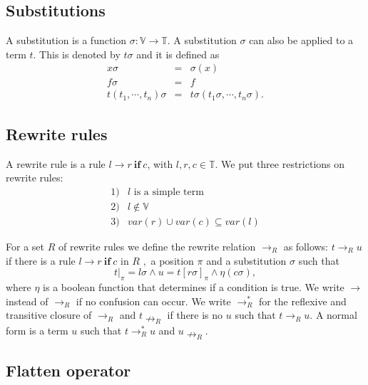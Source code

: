 \documentclass{article}
\begin{document}
\subsection{Substitutions}

A substitution is a function $\sigma :\mathbb{V\rightarrow T}$. A
substitution $\sigma $ can also be applied to a term $t$. This is denoted by 
$t\sigma $ and it is defined as%
\begin{equation*}
\begin{array}{lll}
x\sigma & = & \sigma (x) \\ 
f\sigma & = & f \\ 
t(t_{1},\cdots ,t_{n})\sigma & = & t\sigma (t_{1}\sigma ,\cdots ,t_{n}\sigma
).%
\end{array}%
\end{equation*}

\subsection{Rewrite rules}

A rewrite rule is a rule $l\rightarrow r\ \mathbf{if}\ c$, with $l,r,c\in 
\mathbb{T}$. We put three restrictions on rewrite rules:%
\begin{equation*}
\begin{array}{ll}
1) & l\text{ is a simple term} \\ 
2) & l\notin \mathbb{V} \\ 
3) & var(r)\cup var(c)\subseteq var(l)%
\end{array}%
\end{equation*}

For a set $R$ of rewrite rules we define the rewrite relation $\rightarrow
_{R}$ as follows: $t\rightarrow _{R}u$ if there is a rule $l\rightarrow r\ 
\mathbf{if}\ c$ in $R$ $,$ a position $\pi $ and a substitution $\sigma $
such that%
\begin{equation}
t|_{\pi }=l\sigma \wedge u=t[r\sigma ]_{\pi }\wedge \eta (c\sigma ),
\label{eq:rewriting}
\end{equation}%
where $\eta $ is a boolean function that determines if a condition is true.
We write $\rightarrow $ instead of $\rightarrow _{R}$ if no confusion can
occur. We write $\rightarrow _{R}^{\ast }$ for the reflexive and transitive
closure of $\rightarrow _{R}$ and $t\nrightarrow _{R}$ if there is no $u$
such that $t\rightarrow _{R}u$. A normal form is a term $u$ such that $%
t\rightarrow _{R}^{\ast }u$ and $u\nrightarrow _{R}$.

\subsection{Flatten operator}
\end{document}
